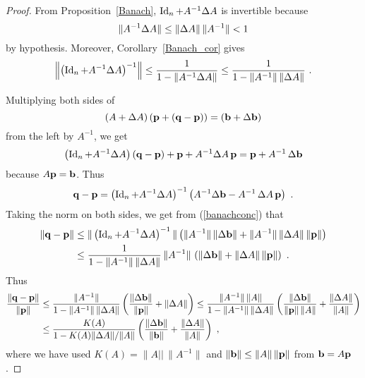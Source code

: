 \begin{proof}
From Proposition~\ref{Banach}, $\operatorname{Id}_n + A^{-1}\Delta{A}$ is invertible
because
\[
\|A^{-1}\Delta{A}\| \leq \|\Delta{A}\| \, \|A^{-1}\| < 1
\]
by hypothesis.  Moreover, Corollary~\ref{Banach_cor} gives
\begin{equation}\label{banachconc}
\left\|\left( \operatorname{Id}_n + A^{-1}\Delta{A} \right)^{-1} \right\| \leq
\frac{1}{1 - \|A^{-1}\Delta{A}\|} \leq
\frac{1}{1 - \|A^{-1}\|\,\|\Delta{A}\|} \ .
\end{equation}

Multiplying both sides of
\[
(A+\Delta{A})\left(\mathbf{p} + (\mathbf{q}-\mathbf{p})\right)
= (\mathbf{b} + \Delta{\mathbf{b}})
\]
from the left by $A^{-1}$, we get
\[
\left(\operatorname{Id}_n + A^{-1} \Delta{A} \right) \left(\mathbf{q}-\mathbf{p}\right)
+\mathbf{p} + A^{-1}\Delta{A} \, \mathbf{p} = \mathbf{p} + A^{-1}\,\Delta{\mathbf{b}}
\]
because $A\mathbf{p}=\mathbf{b}$.  Thus
\[
\VEC{q}-\VEC{p} = \left(\Id_n + A^{-1} \dtx{A} \right)^{-1}
\left( A^{-1} \dtx{\VEC{b}} - A^{-1}\,\dtx{A} \, \VEC{p} \right) \ .
\]
Taking the norm on both sides, we get from (\ref{banachconc}) that
\begin{align*}
\| \mathbf{q}-\mathbf{p} \| &\leq \|\left(\operatorname{Id}_n + A^{-1} \Delta{A} \right)^{-1} \|
\left( \|A^{-1}\|\, \|\Delta{\mathbf{b}}\| +
 \|A^{-1}\|\, \|\Delta{A} \| \, \| \mathbf{p} \|\right) \\
&\leq \frac{1}{1 - \|A^{-1}\|\, \|\Delta{A}\|}\, \|A^{-1}\|\,
\left( \|\Delta{\mathbf{b}}\| + \|\Delta{A} \|\, \| \mathbf{p} \|\right) \ .
\end{align*}
Thus
\begin{align*}
\frac{\| \mathbf{q}-\mathbf{p} \|}{\|\mathbf{p}\|}
&\leq \frac{\|A^{-1}\|}{1 - \|A^{-1}\|\, \|\Delta{A}\|}
\left( \frac{\|\Delta{\mathbf{b}}\|}{\|\mathbf{p}\|} + \|\Delta{A} \|\right)
\leq \frac{\|A^{-1}\|\, \|A\|}{1 - \|A^{-1}\|\, \|\Delta{A}\|}
\left( \frac{\|\Delta{\mathbf{b}}\|}{\|\mathbf{p}\|\, \|A\|}
+ \frac{\|\Delta{A}\|}{\|A\|} \right) \\
&\leq \frac{K(A)}{1 - K(A) \|\Delta{A}\|/\|A\|}
\left( \frac{\|\Delta{\mathbf{b}}\|}{\|\mathbf{b}\|}
+ \frac{\|\Delta{A}\|}{\|A\|} \right) \ ,
\end{align*}
where we have used $K(A) = \|A||\, \|A^{-1}\|$ and
$\|\mathbf{b}\| \leq \|A\|\, \|\mathbf{p}\|$ from $\mathbf{b}=A\mathbf{p}$.
\end{proof}

